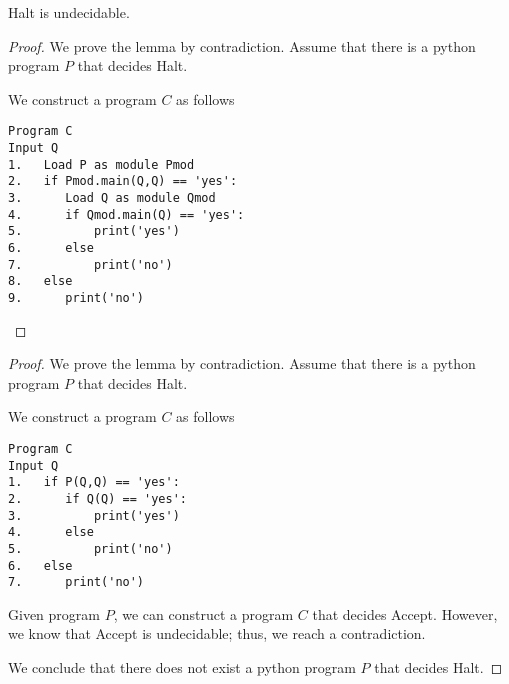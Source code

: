 
\begin{frame}[fragile=true]
  \begin{lemma}
    {\sc Halt} is undecidable.
  \end{lemma}
  \begin{proof}
    We prove the lemma by contradiction.  Assume that there is a
    python program $P$ that decides {\sc Halt}. \pause

    We construct a program $C$ as follows
    {\small
\begin{verbatim}
Program C
Input Q
1.   Load P as module Pmod
2.   if Pmod.main(Q,Q) == 'yes':
3.      Load Q as module Qmod
4.      if Qmod.main(Q) == 'yes':
5.          print('yes')
6.      else
7.          print('no')
8.   else
9.      print('no')
\end{verbatim}
}
  \end{proof}
\end{frame}

\begin{frame}[fragile=true]
  \begin{proof}
    We prove the lemma by contradiction.  Assume that there is a
    python program $P$ that decides {\sc Halt}.

    We construct a program $C$ as follows
    {\small
\begin{verbatim}
Program C
Input Q
1.   if P(Q,Q) == 'yes':
2.      if Q(Q) == 'yes':
3.          print('yes')
4.      else
5.          print('no')
6.   else
7.      print('no')
\end{verbatim}
    }

    \pause

    Given program $P$, we can construct a program $C$ that decides
    {\sc Accept}.  \pause However, we know that {\sc Accept} is
    undecidable; thus, we reach a contradiction.

    We conclude that there does not exist a python program $P$ that
    decides {\sc Halt}.
  \end{proof}
\end{frame}

